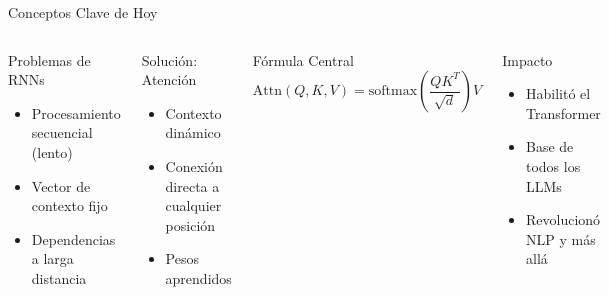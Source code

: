 \documentclass[aspectratio=169]{beamer}
\begin{document}
\begin{frame}{Conceptos Clave de Hoy}
    \begin{columns}[t]
        \begin{block}{Problemas de RNNs}
            \begin{itemize}
                \item Procesamiento secuencial (lento)
                \item Vector de contexto fijo
                \item Dependencias a larga distancia
            \end{itemize}
        \end{block}
        
        \begin{block}{Solución: Atención}
            \begin{itemize}
                \item Contexto dinámico
                \item Conexión directa a cualquier posición
                \item Pesos aprendidos
            \end{itemize}
        \end{block}
        
        \begin{block}{Fórmula Central}
            \[
            \text{Attn}(Q,K,V) = \text{softmax}\left(\frac{QK^T}{\sqrt{d}}\right)V
            \]
        \end{block}
        
        \begin{block}{Impacto}
            \begin{itemize}
                \item Habilitó el Transformer
                \item Base de todos los LLMs
                \item Revolucionó NLP y más allá
            \end{itemize}
        \end{block}
    \end{columns}
\end{frame}
\end{document}
